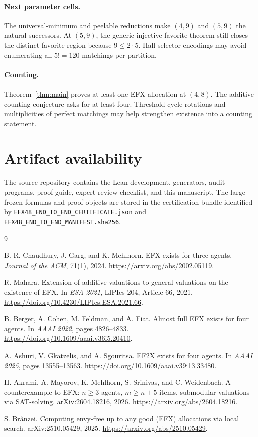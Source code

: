 \documentclass[11pt]{article}
\theoremstyle{definition}
\begin{document}
\paragraph{Next parameter cells.}
The universal-minimum and peelable reductions make $(4,9)$ and $(5,9)$ the
natural successors. At $(5,9)$, the generic injective-favorite theorem still
closes the distinct-favorite region because $9\le2\cdot5$. Hall-selector
encodings may avoid enumerating all $5!=120$ matchings per partition.

\paragraph{Counting.}
Theorem~\ref{thm:main} proves at least one EFX allocation at $(4,8)$. The
additive counting conjecture asks for at least four. Threshold-cycle
rotations and multiplicities of perfect matchings may help strengthen
existence into a counting statement.

\section*{Artifact availability}

The source repository contains the Lean development, generators, audit
programs, proof guide, expert-review checklist, and this manuscript. The
large frozen formulas and proof objects are stored in the certification
bundle identified by
\texttt{EFX48\_END\_TO\_END\_CERTIFICATE.json} and
\texttt{EFX48\_END\_TO\_END\_MANIFEST.sha256}.

\begin{thebibliography}{9}

B. R. Chaudhury, J. Garg, and K. Mehlhorn.
\newblock EFX exists for three agents.
\newblock \emph{Journal of the ACM}, 71(1), 2024.
\newblock \url{https://arxiv.org/abs/2002.05119}.

R. Mahara.
\newblock Extension of additive valuations to general valuations on the
existence of EFX.
\newblock In \emph{ESA 2021}, LIPIcs 204, Article 66, 2021.
\newblock \url{https://doi.org/10.4230/LIPIcs.ESA.2021.66}.

B. Berger, A. Cohen, M. Feldman, and A. Fiat.
\newblock Almost full EFX exists for four agents.
\newblock In \emph{AAAI 2022}, pages 4826--4833.
\newblock \url{https://doi.org/10.1609/aaai.v36i5.20410}.

A. Ashuri, V. Gkatzelis, and A. Sgouritsa.
\newblock EF2X exists for four agents.
\newblock In \emph{AAAI 2025}, pages 13555--13563.
\newblock \url{https://doi.org/10.1609/aaai.v39i13.33480}.

H. Akrami, A. Mayorov, K. Mehlhorn, S. Srinivas, and C. Weidenbach.
\newblock A counterexample to EFX: $n\ge3$ agents, $m\ge n+5$ items,
submodular valuations via SAT-solving.
\newblock arXiv:2604.18216, 2026.
\newblock \url{https://arxiv.org/abs/2604.18216}.

S. Br\^anzei.
\newblock Computing envy-free up to any good (EFX) allocations via local
search.
\newblock arXiv:2510.05429, 2025.
\newblock \url{https://arxiv.org/abs/2510.05429}.

\end{thebibliography}
\end{document}
